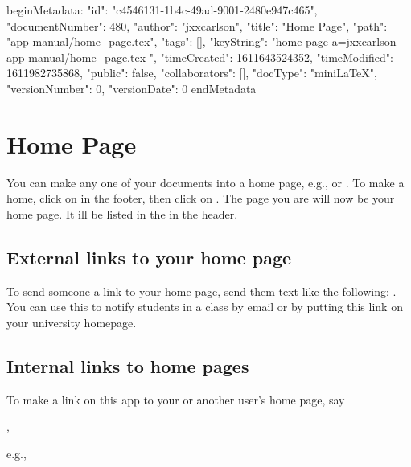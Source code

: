 beginMetadata:
{
    "id": "c4546131-1b4c-49ad-9001-2480e947c465",
    "documentNumber": 480,
    "author": "jxxcarlson",
    "title": "Home Page",
    "path": "app-manual/home_page.tex",
    "tags": [],
    "keyString": "home page a=jxxcarlson app-manual/home_page.tex ",
    "timeCreated": 1611643524352,
    "timeModified": 1611982735868,
    "public": false,
    "collaborators": [],
    "docType": "miniLaTeX",
    "versionNumber": 0,
    "versionDate": 0
}
endMetadata
\setcounter{section}{3}



\section{Home Page}

You can make any one of your documents into a home page, e.g.,  or .  To make a home, click on  in the footer, then click on .  The page you are will now be your home page.  It ill be listed in the  in the header.

\subsection{External links to your home page}

To send someone a link to your home page, send them text like the following: .  You can use this to notify students in a class by email or by putting this link on your university homepage. 


\subsection{Internal links to home pages}

To make a link on this app to your or another user's home page, say 

\begin{indent}
, 
\end{indent}

e.g., 

\begin{indent}
} 
\end{indent}

